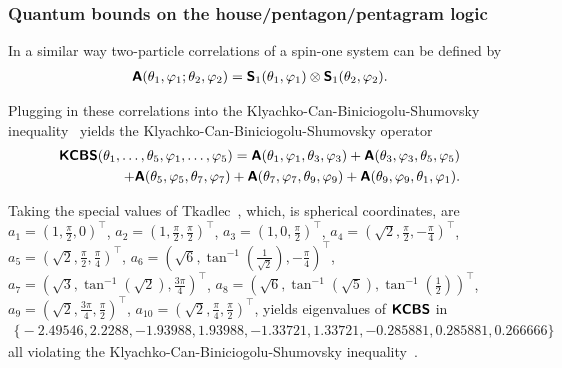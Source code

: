 \subsubsection{Quantum bounds on the house/pentagon/pentagram logic}


In a similar way  two-particle correlations of a spin-one system can be defined by
\begin{equation}
\begin{split}
\textsf{\textbf{A}} (\theta_1 ,\varphi_1;\theta_2 ,\varphi_2)
=
\textsf{\textbf{S}}_1 (\theta_1 ,\varphi_1) \otimes
\textsf{\textbf{S}}_1 (\theta_2 ,\varphi_2)
.
\end{split}
\label{e-2017-b-whatever-e6}
\end{equation}

Plugging in these correlations into the Klyachko-Can-Biniciogolu-Shumovsky inequality~\cite{Klyachko-2008}
yields  the Klyachko-Can-Biniciogolu-Shumovsky operator
\begin{equation}
\begin{split}
\textsf{\textbf{KCBS}}( \theta_1, \ldots , \theta_5 ,\varphi_1, \ldots ,\varphi_5)=
\textsf{\textbf{A}}( \theta_1,\varphi_1, \theta_3,\varphi_3) +
\textsf{\textbf{A}} ( \theta_3,\varphi_3, \theta_5,\varphi_5)  \\
+ \textsf{\textbf{A}} ( \theta_5,\varphi_5, \theta_7,\varphi_7 ) +
\textsf{\textbf{A}} ( \theta_7,\varphi_7, \theta_9,\varphi_9)  +
\textsf{\textbf{A}} ( \theta_9,\varphi_9, \theta_1,\varphi_1)
.
\end{split}
\label{e-2017-b-whatever-e7}
\end{equation}

Taking the special values of Tkadlec~\cite{tkadlec-priv-1995},
which, is spherical coordinates, are
$a_{1} = \left(   1 , \frac{\pi }{2} , 0  \right)^\intercal$,
$a_{2} = \left(   1 , \frac{\pi }{2} , \frac{\pi }{2}  \right)^\intercal$,
$a_{3} = \left(   1 , 0 , \frac{\pi }{2}  \right)^\intercal$,
$a_{4} = \left(   \sqrt{2} , \frac{\pi }{2} , -\frac{\pi }{4}  \right)^\intercal$,
$a_{5} = \left(   \sqrt{2} , \frac{\pi }{2} , \frac{\pi }{4}  \right)^\intercal$,
$a_{6} = \left(   \sqrt{6} , \tan ^{-1}\left(\frac{1}{\sqrt{2}}\right) , -\frac{\pi }{4}  \right)^\intercal$,
$a_{7} = \left(   \sqrt{3} , \tan ^{-1}\left(\sqrt{2}\right) , \frac{3 \pi }{4}  \right)^\intercal$,
$a_{8} = \left(   \sqrt{6} , \tan ^{-1}\left(\sqrt{5}\right) , \tan ^{-1}\left(\frac{1}{2}\right)  \right)^\intercal$,
$a_{9} = \left(   \sqrt{2} , \frac{3 \pi }{4} , \frac{\pi }{2}  \right)^\intercal$,
$a_{10} = \left(  \sqrt{2} , \frac{\pi }{4} , \frac{\pi }{2}  \right)^\intercal$,
 yields  eigenvalues of $\textsf{\textbf{KCBS}}$ in
\begin{equation}
\begin{split}
\big\{-2.49546, 2.2288, -1.93988, 1.93988, -1.33721,
1.33721, -0.285881, 0.285881, 0.266666\big\}
\end{split}
\label{e-2017-b-whatever-e7kcbs}
\end{equation}
all violating the Klyachko-Can-Biniciogolu-Shumovsky inequality~\cite{Klyachko-2008}.


